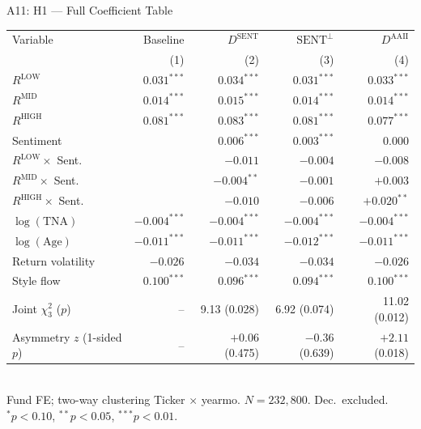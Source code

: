 \documentclass[10pt, aspectratio=169]{beamer}
\begin{document}
\begin{frame}{A11: H1 — Full Coefficient Table}
  \scriptsize
  \setlength{\tabcolsep}{5pt}
  \begin{tabular}{@{}lrrrr@{}}
    \toprule
    Variable & Baseline & $D^{\text{SENT}}$ & $\text{SENT}^\perp$ & $D^{\text{AAII}}$ \\
    & (1) & (2) & (3) & (4) \\
    \midrule
    $R^{\text{LOW}}$              & $0.031^{***}$ & $0.034^{***}$ & $0.031^{***}$ & $0.033^{***}$ \\
    $R^{\text{MID}}$              & $0.014^{***}$ & $0.015^{***}$ & $0.014^{***}$ & $0.014^{***}$ \\
    $R^{\text{HIGH}}$             & $0.081^{***}$ & $0.083^{***}$ & $0.081^{***}$ & $0.077^{***}$ \\
    Sentiment                     &               & $0.006^{***}$ & $0.003^{***}$ & $0.000$ \\
    $R^{\text{LOW}}\times$ Sent.  &               & $-0.011$      & $-0.004$      & $-0.008$ \\
    $R^{\text{MID}}\times$ Sent.  &               & $-0.004^{**}$ & $-0.001$      & $+0.003$ \\
    $R^{\text{HIGH}}\times$ Sent. &               & $-0.010$      & $-0.006$      & $+0.020^{**}$ \\
    $\log(\text{TNA})$            & $-0.004^{***}$& $-0.004^{***}$& $-0.004^{***}$& $-0.004^{***}$ \\
    $\log(\text{Age})$            & $-0.011^{***}$& $-0.011^{***}$& $-0.012^{***}$& $-0.011^{***}$ \\
    Return volatility             & $-0.026$      & $-0.034$      & $-0.034$      & $-0.026$ \\
    Style flow                    & $0.100^{***}$ & $0.096^{***}$ & $0.094^{***}$ & $0.100^{***}$ \\
    \midrule
    Joint $\chi^2_3$ ($p$)        & --            & 9.13 (0.028)  & 6.92 (0.074)  & 11.02 (0.012) \\
    Asymmetry $z$ (1-sided $p$)   & --            & $+0.06$ (0.475) & $-0.36$ (0.639) & $+2.11$ (0.018) \\
    \bottomrule
  \end{tabular}
  \vspace{3pt}\\
  \tiny Fund FE; two-way clustering Ticker $\times$ yearmo. $N=232{,}800$. Dec.\ excluded.
  $^{*}p<0.10$, $^{**}p<0.05$, $^{***}p<0.01$.
\end{frame}
\end{document}
